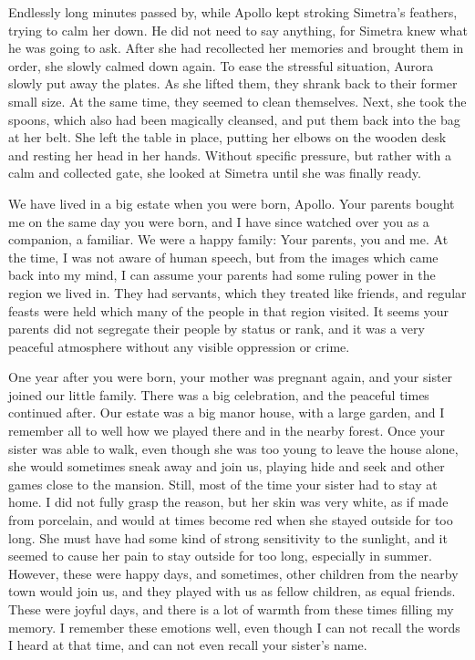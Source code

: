 Endlessly long minutes passed by, while Apollo kept stroking Simetra's feathers, trying to calm her down. He did not need to say anything, for Simetra knew what he was going to ask. After she had recollected her memories and brought them in order, she slowly calmed down again. To ease the stressful situation, Aurora slowly put away the plates. As she lifted them, they shrank back to their former small size. At the same time, they seemed to clean themselves. Next, she took the spoons, which also had been magically cleansed, and put them back into the bag at her belt. She left the table in place, putting her elbows on the wooden desk and resting her head in her hands. Without specific pressure, but rather with a calm and collected gate, she looked at Simetra until she was finally ready.

\froufrou{}

We have lived in a big estate when you were born, Apollo. Your parents bought me on the same day you were born, and I have since watched over you as a companion, a familiar. We were a happy family: Your parents, you and me. At the time, I was not aware of human speech, but from the images which came back into my mind, I can assume your parents had some ruling power in the region we lived in. They had servants, which they treated like friends, and regular feasts were held which many of the people in that region visited. It seems your parents did not segregate their people by status or rank, and it was a very peaceful atmosphere without any visible oppression or crime.

One year after you were born, your mother was pregnant again, and your sister joined our little family. There was a big celebration, and the peaceful times continued after. Our estate was a big manor house, with a large garden, and I remember all to well how we played there and in the nearby forest. Once your sister was able to walk, even though she was too young to leave the house alone, she would sometimes sneak away and join us, playing hide and seek and other games close to the mansion. Still, most of the time your sister had to stay at home. I did not fully grasp the reason, but her skin was very white, as if made from porcelain, and would at times become red when she stayed outside for too long. She must have had some kind of strong sensitivity to the sunlight, and it seemed to cause her pain to stay outside for too long, especially in summer. However, these were happy days, and sometimes, other children from the nearby town would join us, and they played with us as fellow children, as equal friends. These were joyful days, and there is a lot of warmth from these times filling my memory. I remember these emotions well, even though I can not recall the words I heard at that time, and can not even recall your sister's name.


